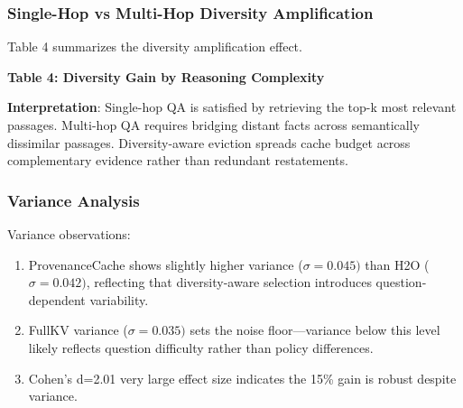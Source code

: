 \subsubsection{Single-Hop vs Multi-Hop Diversity Amplification}

Table 4 summarizes the diversity amplification effect.

\textbf{Table 4: Diversity Gain by Reasoning Complexity}

\begin{table}[htbp]
\centering
{}
\end{table}

\textbf{Interpretation}: Single-hop QA is satisfied by retrieving the top-k most relevant passages. Multi-hop QA requires bridging distant facts across semantically dissimilar passages. Diversity-aware eviction spreads cache budget across complementary evidence rather than redundant restatements.

\subsubsection{Variance Analysis}

Variance observations:

\begin{enumerate}
\item ProvenanceCache shows slightly higher variance ($\sigma =0.045)$ than H2O ($\sigma =0.042)$, reflecting that diversity-aware selection introduces question-dependent variability.
\item FullKV variance ($\sigma =0.035)$ sets the noise floor---variance below this level likely reflects question difficulty rather than policy differences.
\item Cohen's d=2.01 very large effect size indicates the 15\% gain is robust despite variance.
\end{enumerate}

